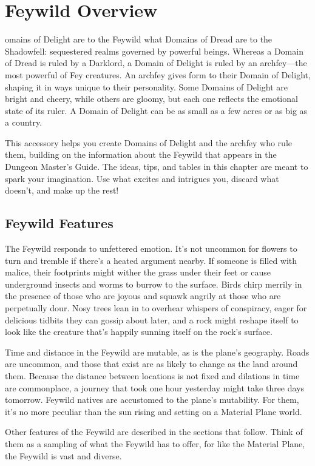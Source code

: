 \documentclass[10pt,a4paper,twoside,bg=print,twocolumn,openany,nodeprecatedcode]{dndbook}
\date{}
\begin{document}
\frontmatter
\tableofcontents
\mainmatter
\chapter{Feywild Overview}
omains of Delight are to the Feywild what Domains of Dread are to the Shadowfell: sequestered realms governed by powerful beings. Whereas a Domain of Dread is ruled by a Darklord, a Domain of Delight is ruled by an archfey—the most powerful of Fey creatures. An archfey gives form to their Domain of Delight, shaping it in ways unique to their personality. Some Domains of Delight are bright and cheery, while others are gloomy, but each one reflects the emotional state of its ruler. A Domain of Delight can be as small as a few acres or as big as a country.


This accessory helps you create Domains of Delight and the archfey who rule them, building on the information about the Feywild that appears in the Dungeon Master's Guide. The ideas, tips, and tables in this chapter are meant to spark your imagination. Use what excites and intrigues you, discard what doesn't, and make up the rest!

\section{Feywild Features}
The Feywild responds to unfettered emotion. It's not uncommon for flowers to turn and tremble if there's a heated argument nearby. If someone is filled with malice, their footprints might wither the grass under their feet or cause underground insects and worms to burrow to the surface. Birds chirp merrily in the presence of those who are joyous and squawk angrily at those who are perpetually dour. Nosy trees lean in to overhear whispers of conspiracy, eager for delicious tidbits they can gossip about later, and a rock might reshape itself to look like the creature that's happily sunning itself on the rock's surface.

Time and distance in the Feywild are mutable, as is the plane's geography. Roads are uncommon, and those that exist are as likely to change as the land around them. Because the distance between locations is not fixed and dilations in time are commonplace, a journey that took one hour yesterday might take three days tomorrow. Feywild natives are accustomed to the plane's mutability. For them, it's no more peculiar than the sun rising and setting on a Material Plane world.

Other features of the Feywild are described in the sections that follow. Think of them as a sampling of what the Feywild has to offer, for like the Material Plane, the Feywild is vast and diverse.
\end{document}

